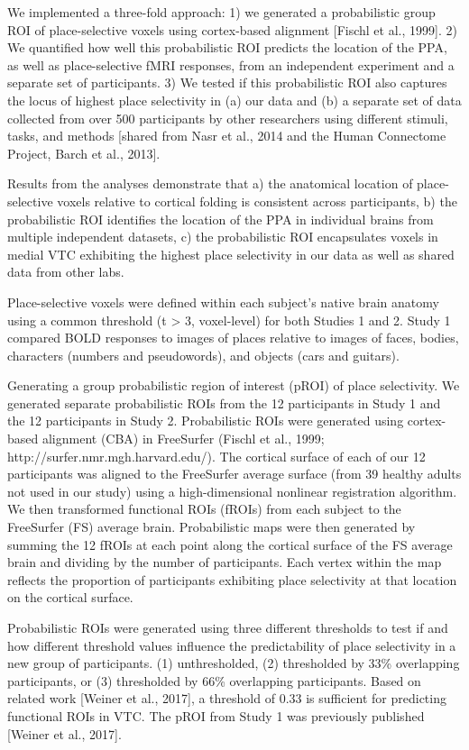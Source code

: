 We implemented a three-fold approach:
%
1) we generated a probabilistic group ROI of place-selective voxels using
cortex-based alignment [Fischl et al., 1999].
%
2) We quantified how well this probabilistic ROI predicts the location of
the PPA, as well as place-selective fMRI responses, from an independent
experiment and a separate set of participants.
%
3) We tested if this probabilistic ROI also captures the locus of highest
place selectivity in (a) our data and (b) a separate set of data collected from
over 500 participants by other researchers using different stimuli, tasks, and
methods [shared from Nasr et al., 2014 and the Human Connectome Project, Barch
et al., 2013].

Results from the analyses demonstrate that
%
a) the anatomical location of place-selective voxels relative to cortical
folding is consistent across participants,
%
b) the probabilistic ROI identifies the location of the PPA in individual
brains from multiple independent datasets,
%
c) the probabilistic ROI encapsulates voxels in medial VTC exhibiting the
highest place selectivity in our data as well as shared data from other labs.
%

Place-selective voxels were defined within each subject's native brain anatomy
using a common threshold (t > 3, voxel-level) for both Studies 1 and 2.
%
Study 1 compared BOLD responses to images of places relative to images of faces,
bodies, characters (numbers and pseudowords), and objects (cars and guitars).

Generating a group probabilistic region of interest (pROI) of place selectivity.
%
We generated separate probabilistic ROIs from the 12 participants in Study 1 and
the 12 participants in Study 2.
%
Probabilistic ROIs were generated using cortex-based alignment (CBA) in
FreeSurfer (Fischl et al., 1999; http://surfer.nmr.mgh.harvard.edu/).
%
The cortical surface of each of our 12 participants was aligned to the
FreeSurfer average surface (from 39 healthy adults not used in our study) using
a high-dimensional nonlinear registration algorithm.
%
We then transformed functional ROIs (fROIs) from each subject to the FreeSurfer
(FS) average brain.
%
Probabilistic maps were then generated by summing the 12 fROIs at each point
along the cortical surface of the FS average brain and dividing by the number of
participants.
%
Each vertex within the map reflects the proportion of participants exhibiting
place selectivity at that location on the cortical surface.

Probabilistic ROIs were generated using three different thresholds to test if
and how different threshold values influence the predictability of place
selectivity in a new group of participants.
%
(1) unthresholded,
%
(2) thresholded by 33\% overlapping participants, or
%
(3) thresholded by 66\% overlapping participants.
%
Based on related work [Weiner et al., 2017], a threshold of 0.33 is sufficient
for predicting functional ROIs in VTC.
%
The pROI from Study 1 was previously published [Weiner et al., 2017].

